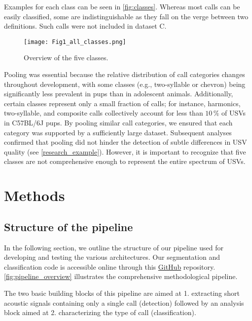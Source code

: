 \documentclass[preprint,NumberedRefs]{JASA}
\begin{document}
Examples for each class can be seen in \autoref{fig:classes}. Whereas most calls can be easily classified, some are indistinguishable as they fall on the verge between two definitions. Such calls were not included in dataset C.

\begin{figure}[ht]
    \begin{center}
    \texttt{[image: Fig1\_all\_classes.png]}
    \caption{\label{fig:classes}{Overview of the five classes.}}
    \end{center}
\end{figure}

Pooling was essential because the relative distribution of call categories changes throughout development, with some classes (e.g., two-syllable or chevron) being significantly less prevalent in pups than in adolescent animals. \cite{Peleh2019-ic} Additionally, certain classes represent only a small fraction of calls; for instance, harmonics, two-syllable, and composite calls collectively account for less than \(10\,\mathrm{\%}\) of USVs in C57BL/6J pups. \cite{Scattoni2008-vp} By pooling similar call categories, we ensured that each category was supported by a sufficiently large dataset. Subsequent analyses confirmed that pooling did not hinder the detection of subtle differences in USV quality (see \autoref{research_example}). However, it is important to recognize that five classes are not comprehensive enough to represent the entire spectrum of USVs.

\section{Methods}
\label{sec:Methods}

\subsection{Structure of the pipeline}
\label{sec:Structure_of_the_pipeline}

In the following section, we outline the structure of our pipeline used for developing and testing the various architectures. Our segmentation and classification code is accessible online through this \href{https://github.com/Nemptis/Neonatal_USV_Detection_Classification.git}{GitHub} repository. \autoref{fig:pipeline_overview} illustrates the comprehensive methodological pipeline.

The two basic building blocks of this pipeline are aimed at 1. extracting short acoustic signals containing only a single call (detection) followed by an analysis block aimed at 2. characterizing the type of call (classification).
\end{document}
